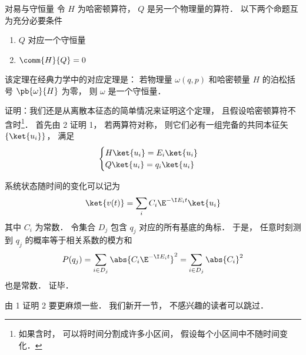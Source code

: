
\begin{theorem}{对易与守恒量}
令 $H$ 为哈密顿算符， $Q$ 是另一个物理量的算符． 以下两个命题互为充分必要条件
\begin{enumerate}
\item $Q$ 对应一个守恒量
\item $\comm{H}{Q} = 0$
\end{enumerate}
\end{theorem}

该定理在经典力学中的对应定理是： 若物理量 $\omega(q, p)$ 和哈密顿量 $H$ 的泊松括号 $\pb{\omega}{H}$ 为零， 则 $\omega$ 是一个守恒量．

证明：我们还是从离散本征态的简单情况来证明这个定理， 且假设哈密顿算符不含时\footnote{如果含时， 可以将时间分割成许多小区间， 假设每个小区间中不随时间变化．}． 首先由 2 证明 1， 若两算符对称， 则它们必有一组完备的共同本征矢 $\{\ket{u_i}\}$， 满足
\begin{equation}
\begin{cases}
H \ket{u_i} = E_i \ket{u_i}\\
Q \ket{u_i} = q_i \ket{u_i}
\end{cases}
\end{equation}

系统状态随时间的变化可以记为
\begin{equation}
\ket{v(t)} = \sum_i C_i \E^{-\I E_i t} \ket{u_i}
\end{equation}
其中 $C_i$ 为常数． 令集合 $D_j$ 包含 $q_j$ 对应的所有基底的角标． 于是， 任意时刻测到 $q_j$ 的概率等于相关系数的模方和
\begin{equation}
P(q_j) = \sum_{i \in D_j} \abs{C_i \E^{-\I E_i t}}^2 = \sum_{i \in D_j} \abs{C_i}^2
\end{equation}
也是常数． 证毕．

由 1 证明 2 要更麻烦一些． 我们新开一节， 不感兴趣的读者可以跳过．

